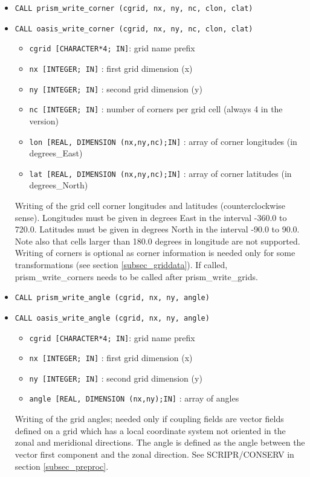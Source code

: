 \begin{itemize}
\item {\tt CALL prism\_write\_corner (cgrid, nx, ny, nc, clon, clat)}
\item {\tt CALL oasis\_write\_corner (cgrid, nx, ny, nc, clon, clat)}

 \begin{itemize}
    \item {\tt cgrid [CHARACTER*4; IN]}: grid name prefix
    \item {\tt nx [INTEGER; IN]} : first grid dimension (x)
    \item {\tt ny [INTEGER; IN]} : second grid dimension (y)
    \item {\tt nc [INTEGER; IN]} : number of corners per grid cell (always 4 in the version)
    \item {\tt lon [REAL, DIMENSION (nx,ny,nc);IN]} : array of corner
    longitudes (in degrees\_East)
    \item {\tt lat [REAL, DIMENSION (nx,ny,nc);IN]} : array of corner
    latitudes (in degrees\_North)
 \end{itemize}

 Writing of the grid cell corner longitudes and latitudes
 (counterclockwise sense). Longitudes must be given in degrees East in
 the interval -360.0 to 720.0. Latitudes must be given in degrees
 North in the interval -90.0 to 90.0. Note also that cells larger than
 180.0 degrees in longitude are not supported. Writing of corners is
 optional as corner information is needed only for some
 transformations (see section \ref{subsec_griddata}). If called,
 prism\_write\_corners needs to be called after prism\_write\_grids.

\item {\tt CALL prism\_write\_angle (cgrid, nx, ny, angle)}
\item {\tt CALL oasis\_write\_angle (cgrid, nx, ny, angle)}

 \begin{itemize}
    \item {\tt cgrid [CHARACTER*4; IN]}: grid name prefix
    \item {\tt nx [INTEGER; IN]} : first grid dimension (x)
    \item {\tt ny [INTEGER; IN]} : second grid dimension (y)
    \item {\tt angle [REAL, DIMENSION (nx,ny);IN]} : array of angles
 \end{itemize}

 Writing of the grid angles; needed only if coupling fields
 are vector fields defined on a grid which has a local coordinate system not oriented in 
 the zonal and meridional directions. The angle is defined as the angle between the vector
 first component and the zonal direction. See SCRIPR/CONSERV in section \ref{subsec_preproc}.


\end{itemize}
